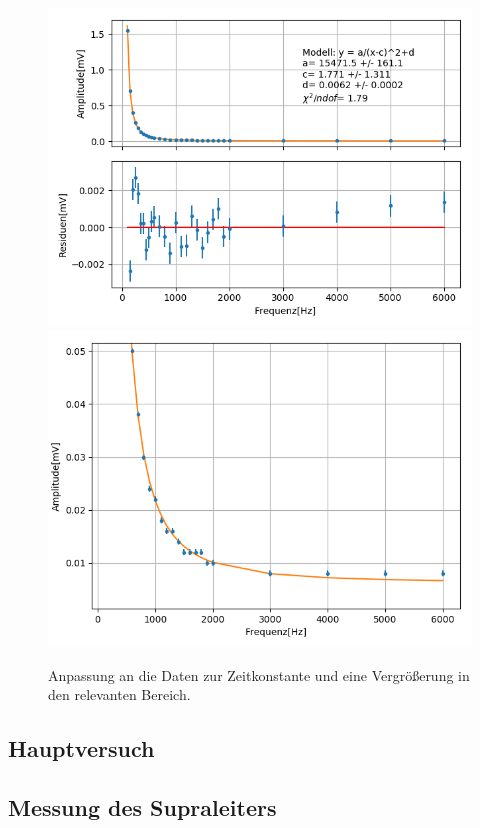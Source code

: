 \documentclass[12pt,a4paper]{article}
\begin{document}
\begin{figure}
\centering
\includegraphics[scale=0.8]{Bilder/Vorversuch4/Vor4_1.png}
\includegraphics[scale=0.8]{Bilder/Vorversuch4/Vor4_2.png}
\caption{Anpassung an die Daten zur Zeitkonstante und eine Vergrößerung in den relevanten Bereich.}
\label{fig:Vor4_anpassung}
\end{figure}

\subsection{Hauptversuch}
\subsection{Messung des Supraleiters}
\end{document}
